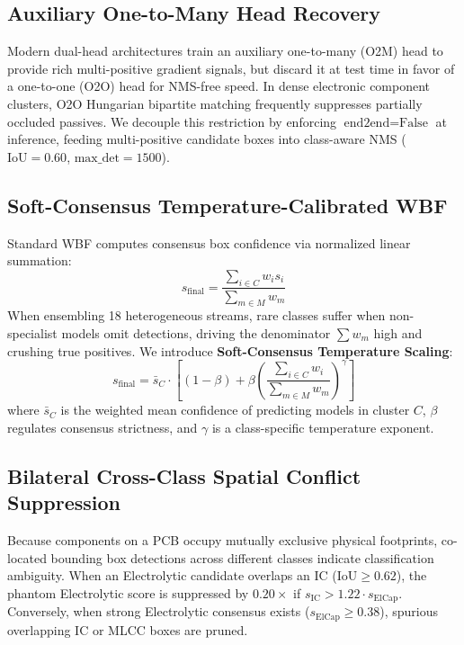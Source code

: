 \subsection{Auxiliary One-to-Many Head Recovery}
Modern dual-head architectures train an auxiliary one-to-many (O2M) head to provide rich multi-positive gradient signals, but discard it at test time in favor of a one-to-one (O2O) head for NMS-free speed. In dense electronic component clusters, O2O Hungarian bipartite matching frequently suppresses partially occluded passives. We decouple this restriction by enforcing $\text{end2end}=\text{False}$ at inference, feeding multi-positive candidate boxes into class-aware NMS ($\text{IoU}=0.60$, $\text{max\_det}=1500$).

\subsection{Soft-Consensus Temperature-Calibrated WBF}
Standard WBF computes consensus box confidence via normalized linear summation:
\begin{equation}
s_{\text{final}} = \frac{\sum_{i \in C} w_i s_i}{\sum_{m \in M} w_m}
\end{equation}
When ensembling 18 heterogeneous streams, rare classes suffer when non-specialist models omit detections, driving the denominator $\sum w_m$ high and crushing true positives. We introduce \textbf{Soft-Consensus Temperature Scaling}:
\begin{equation}
s_{\text{final}} = \bar{s}_C \cdot \left[ (1 - \beta) + \beta \left( \frac{\sum_{i \in C} w_i}{\sum_{m \in M} w_m} \right)^\gamma \right]
\end{equation}
where $\bar{s}_C$ is the weighted mean confidence of predicting models in cluster $C$, $\beta$ regulates consensus strictness, and $\gamma$ is a class-specific temperature exponent.

\subsection{Bilateral Cross-Class Spatial Conflict Suppression}
Because components on a PCB occupy mutually exclusive physical footprints, co-located bounding box detections across different classes indicate classification ambiguity. When an Electrolytic candidate overlaps an IC ($\text{IoU} \ge 0.62$), the phantom Electrolytic score is suppressed by $0.20\times$ if $s_{\text{IC}} > 1.22 \cdot s_{\text{ElCap}}$. Conversely, when strong Electrolytic consensus exists ($s_{\text{ElCap}} \ge 0.38$), spurious overlapping IC or MLCC boxes are pruned.

